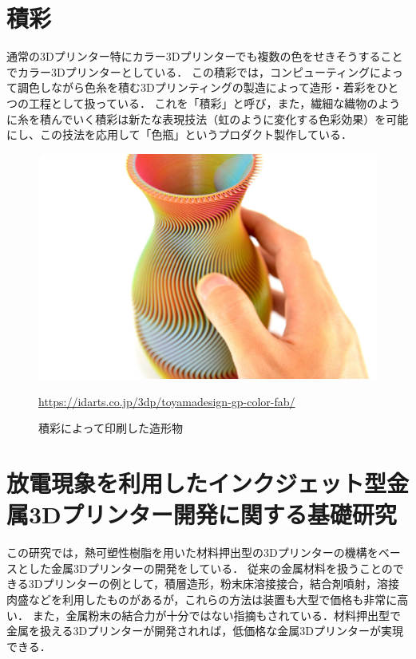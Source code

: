 \section{積彩\cite{h}}
\label{sec:enum}
通常の3Dプリンター特にカラー3Dプリンターでも複数の色をせきそうすることでカラー3Dプリンターとしている．
この積彩では，コンピューティングによって調色しながら色糸を積む3Dプリンティングの製造によって造形・着彩をひとつの工程として扱っている．
これを「積彩」と呼び，また，繊細な織物のように糸を積んでいく積彩は新たな表現技法（虹のように変化する色彩効果）を可能にし、この技法を応用して「色瓶」というプロダクト製作している．

\begin{figure}[H]
  \centering
  \includegraphics[width=12truecm]{./fig/sekisai.jpg}
  \caption{積彩によって印刷した造形物}
  \url{https://idarts.co.jp/3dp/toyamadesign-gp-color-fab/} %
  \label{fig:ferret}
\end{figure}

\section{放電現象を利用したインクジェット型金属3Dプリンター開発に関する基礎研究\cite{j}}
\label{sec:enum}
この研究では，熱可塑性樹脂を用いた材料押出型の3Dプリンターの機構をベースとした金属3Dプリンターの開発をしている．
従来の金属材料を扱うことのできる3Dプリンターの例として，積層造形，粉末床溶接接合，結合剤噴射，溶接肉盛などを利用したものがあるが，これらの方法は装置も大型で価格も非常に高い．
また，金属粉末の結合力が十分ではない指摘もされている．材料押出型で金属を扱える3Dプリンターが開発されれば，低価格な金属3Dプリンターが実現できる．

